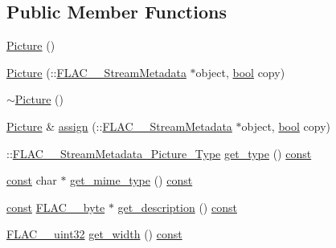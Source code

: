 \subsection*{Public Member Functions}
\begin{DoxyCompactItemize}
\item 
\hyperlink{class_f_l_a_c_1_1_metadata_1_1_picture_aa7ef38f6c7a90fa781acd055b2328983}{Picture} ()
\item 
\hyperlink{class_f_l_a_c_1_1_metadata_1_1_picture_a703d5d8a88e9764714ee2dd25806e381}{Picture} (\+::\hyperlink{struct_f_l_a_c_____stream_metadata}{F\+L\+A\+C\+\_\+\+\_\+\+Stream\+Metadata} $\ast$object, \hyperlink{mac_2config_2i386_2lib-src_2libsoxr_2soxr-config_8h_abb452686968e48b67397da5f97445f5b}{bool} copy)
\item 
\hyperlink{class_f_l_a_c_1_1_metadata_1_1_picture_ae368ed040d9984582199588d9493d112}{$\sim$\+Picture} ()
\item 
\hyperlink{class_f_l_a_c_1_1_metadata_1_1_picture}{Picture} \& \hyperlink{class_f_l_a_c_1_1_metadata_1_1_picture_aa3d7384cb724a842c3471a9ab19f81ed}{assign} (\+::\hyperlink{struct_f_l_a_c_____stream_metadata}{F\+L\+A\+C\+\_\+\+\_\+\+Stream\+Metadata} $\ast$object, \hyperlink{mac_2config_2i386_2lib-src_2libsoxr_2soxr-config_8h_abb452686968e48b67397da5f97445f5b}{bool} copy)
\item 
\+::\hyperlink{group__flac__format_gaf6d3e836cee023e0b8d897f1fdc9825d}{F\+L\+A\+C\+\_\+\+\_\+\+Stream\+Metadata\+\_\+\+Picture\+\_\+\+Type} \hyperlink{class_f_l_a_c_1_1_metadata_1_1_picture_a9484ec6ad01ebd1a81021fc17ccabcd0}{get\+\_\+type} () \hyperlink{getopt1_8c_a2c212835823e3c54a8ab6d95c652660e}{const} 
\item 
\hyperlink{getopt1_8c_a2c212835823e3c54a8ab6d95c652660e}{const} char $\ast$ \hyperlink{class_f_l_a_c_1_1_metadata_1_1_picture_a999adc68a162447fb71f72cc8c0bddba}{get\+\_\+mime\+\_\+type} () \hyperlink{getopt1_8c_a2c212835823e3c54a8ab6d95c652660e}{const} 
\item 
\hyperlink{getopt1_8c_a2c212835823e3c54a8ab6d95c652660e}{const} \hyperlink{ordinals_8h_a5eb569b12d5b047cdacada4d57924ee3}{F\+L\+A\+C\+\_\+\+\_\+byte} $\ast$ \hyperlink{class_f_l_a_c_1_1_metadata_1_1_picture_a3055574b0a8ef19ce16c4d09b9cfd23e}{get\+\_\+description} () \hyperlink{getopt1_8c_a2c212835823e3c54a8ab6d95c652660e}{const} 
\item 
\hyperlink{ordinals_8h_a9c4005ea7ef8d564b0cc993cdd0e4e5e}{F\+L\+A\+C\+\_\+\+\_\+uint32} \hyperlink{class_f_l_a_c_1_1_metadata_1_1_picture_a52af34656cd5e0e07bf3e5801d77500c}{get\+\_\+width} () \hyperlink{getopt1_8c_a2c212835823e3c54a8ab6d95c652660e}{const} 

\end{DoxyCompactItemize}
